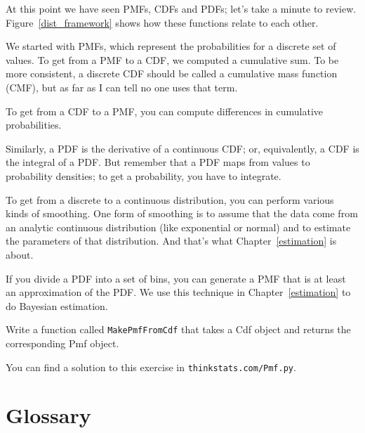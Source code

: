 \documentclass[12pt]{book}
\begin{document}
At this point we have seen PMFs, CDFs and PDFs; let's take a minute
to review.  Figure~\ref{dist_framework} shows how these functions relate
to each other.


We started with PMFs, which represent the probabilities for a discrete
set of values.  To get from a PMF to a CDF, we computed a cumulative sum.
To be more consistent, a discrete CDF should be called a cumulative mass
function (CMF), but as far as I can tell no one uses that term.


To get from a CDF to a PMF, you can compute differences in cumulative
probabilities.


Similarly, a PDF is the derivative of a continuous CDF; or, equivalently,
a CDF is the integral of a PDF.  But remember that a PDF maps from
values to probability densities; to get a probability, you have to
integrate.


To get from a discrete to a continuous distribution, you can perform
various kinds of smoothing.  One form of smoothing is to assume that
the data come from an analytic continuous distribution
(like exponential or normal) and to estimate the parameters of that
distribution.  And that's what Chapter~\ref{estimation} is about.



If you divide a PDF into a set of bins, you can generate a PMF that is
at least an approximation of the PDF.  We use this
technique in Chapter~\ref{estimation} to do Bayesian estimation.

\begin{ex}

Write a function called {\tt MakePmfFromCdf} that takes a Cdf object
and returns the corresponding Pmf object.

You can find a solution to this exercise in {\tt thinkstats.com/Pmf.py}.


\end{ex}

\section{Glossary}
\end{document}
